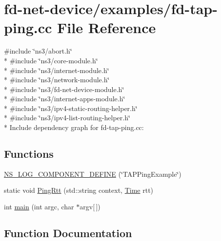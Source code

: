 \hypertarget{fd-tap-ping_8cc}{}\section{fd-\/net-\/device/examples/fd-\/tap-\/ping.cc File Reference}
\label{fd-tap-ping_8cc}
{\ttfamily \#include \char`\"{}ns3/abort.\+h\char`\"{}}\\*
{\ttfamily \#include \char`\"{}ns3/core-\/module.\+h\char`\"{}}\\*
{\ttfamily \#include \char`\"{}ns3/internet-\/module.\+h\char`\"{}}\\*
{\ttfamily \#include \char`\"{}ns3/network-\/module.\+h\char`\"{}}\\*
{\ttfamily \#include \char`\"{}ns3/fd-\/net-\/device-\/module.\+h\char`\"{}}\\*
{\ttfamily \#include \char`\"{}ns3/internet-\/apps-\/module.\+h\char`\"{}}\\*
{\ttfamily \#include \char`\"{}ns3/ipv4-\/static-\/routing-\/helper.\+h\char`\"{}}\\*
{\ttfamily \#include \char`\"{}ns3/ipv4-\/list-\/routing-\/helper.\+h\char`\"{}}\\*
Include dependency graph for fd-\/tap-\/ping.cc\+:
\subsection*{Functions}
\begin{DoxyCompactItemize}
\item 
\hyperlink{fd-tap-ping_8cc_a9edfb221550981d9b4bc5581ac5f9f8d}{N\+S\+\_\+\+L\+O\+G\+\_\+\+C\+O\+M\+P\+O\+N\+E\+N\+T\+\_\+\+D\+E\+F\+I\+NE} (\char`\"{}T\+A\+P\+Ping\+Example\char`\"{})
\item 
static void \hyperlink{fd-tap-ping_8cc_a1a49f760c7e3da367b3406515d2a3ef9}{Ping\+Rtt} (std\+::string context, \hyperlink{classns3_1_1Time}{Time} rtt)
\item 
int \hyperlink{fd-tap-ping_8cc_a0ddf1224851353fc92bfbff6f499fa97}{main} (int argc, char $\ast$argv\mbox{[}$\,$\mbox{]})
\end{DoxyCompactItemize}


\subsection{Function Documentation}
